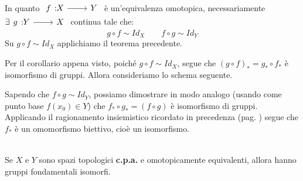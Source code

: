 \begin{demonstration}
In quanto $\funz{f}{X}{Y}$ è un'equivalenza omotopica, necessariamente $\exists \funz{g}{Y}{X}$ continua tale che:
\begin{equation*}
g\circ f\sim Id_X\qquad f\circ g\sim Id_Y
\end{equation*}
Su $g\circ f\sim Id_X$ applichiamo il teorema precedente.
\begin{center}
\end{center}
Per il corollario appena visto, poiché $g\circ f\sim Id_X$, segue che $\left(g\circ f\right)_{\ast}=g_\ast\circ f_\ast$ è isomorfismo di gruppi. Allora consideriamo lo schema seguente.
\begin{center}
\end{center}
Sapendo che $f\circ g\sim Id_Y$, possiamo dimostrare in modo analogo (usando come punto base $f\left(x_0\right)\in Y$) che $f_\ast\circ g_\ast=\left(f\circ g\right)$ è isomorfismo di gruppi.\\
Applicando il ragionamento insiemistico ricordato in precedenza (pag. \pageref{biettivitàinsiemi}) segue che $f_{\ast}$ è un omomorfismo biettivo, cioè un isomorfismo.
\end{demonstration}
\begin{corollary}~{}\\
	Se $X$ e $Y$ sono spazi topologici \textbf{c.p.a.} e omotopicamente equivalenti, allora hanno gruppi fondamentali isomorfi.
\end{corollary}
